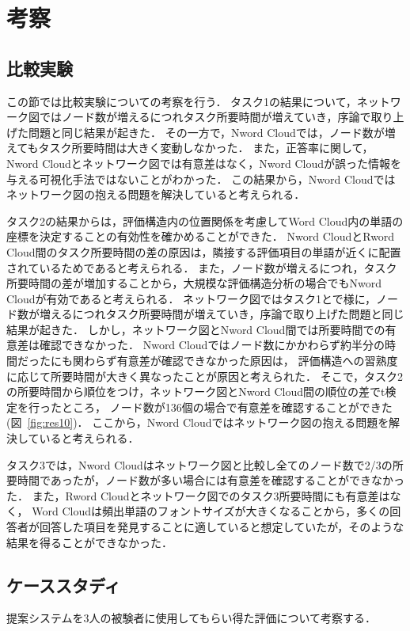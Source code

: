 \documentclass[syuuron]{kuee}
\begin{document}
\chapter{考察}
	\section{比較実験}
	この節では比較実験についての考察を行う．
	タスク1の結果について，ネットワーク図ではノード数が増えるにつれタスク所要時間が増えていき，序論で取り上げた問題と同じ結果が起きた．
	その一方で，Nword Cloudでは，ノード数が増えてもタスク所要時間は大きく変動しなかった．
	また，正答率に関して，Nword Cloudとネットワーク図では有意差はなく，Nword Cloudが誤った情報を与える可視化手法ではないことがわかった．
	この結果から，Nword Cloudではネットワーク図の抱える問題を解決していると考えられる．
	
	タスク2の結果からは，評価構造内の位置関係を考慮してWord Cloud内の単語の座標を決定することの有効性を確かめることができた．
	Nword CloudとRword Cloud間のタスク所要時間の差の原因は，隣接する評価項目の単語が近くに配置されているためであると考えられる．
	また，ノード数が増えるにつれ，タスク所要時間の差が増加することから，大規模な評価構造分析の場合でもNword Cloudが有効であると考えられる．
	ネットワーク図ではタスク1とで様に，ノード数が増えるにつれタスク所要時間が増えていき，序論で取り上げた問題と同じ結果が起きた．
	しかし，ネットワーク図とNword Cloud間では所要時間での有意差は確認できなかった．
	Nword Cloudではノード数にかかわらず約半分の時間だったにも関わらず有意差が確認できなかった原因は，
	評価構造への習熟度に応じて所要時間が大きく異なったことが原因と考えられた．
	そこで，タスク2の所要時間から順位をつけ，ネットワーク図とNword Cloud間の順位の差でt検定を行ったところ，
	ノード数が136個の場合で有意差を確認することができた(図~\ref{fig:res10})．
	ここから，Nword Cloudではネットワーク図の抱える問題を解決していると考えられる．
	
	タスク3では，Nword Cloudはネットワーク図と比較し全てのノード数で2/3の所要時間であったが，ノード数が多い場合には有意差を確認することができなかった．
	また，Rword Cloudとネットワーク図でのタスク3所要時間にも有意差はなく，
	Word Cloudは頻出単語のフォントサイズが大きくなることから，多くの回答者が回答した項目を発見することに適していると想定していたが，そのような結果を得ることができなかった．
	
	\section{ケーススタディ}%
	提案システムを3人の被験者に使用してもらい得た評価について考察する．
\end{document}
